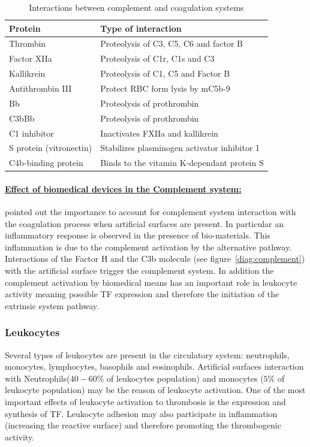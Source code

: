 \documentclass[%
 nofootinbib,
 amsmath,amssymb,
 aps,
 pra,
]{revtex4-1}
\begin{document}
\begin{table}[h]
\begin{tabular}{l l}
\hline
Protein & Type of interaction \\
\hline
Thrombin & Proteolysis of C3, C5, C6 and factor B\\
Factor XIIa & Proteolysis of C1r, C1s and C3\\
Kallikrein & Proteolysis of C1, C5 and Factor B \\
Antithrombin III & Protect RBC form lysis by mC5b-9\\
Bb & Proteolysis of prothrombin \\
C3bBb & Proteolysis of prothrombin \\
C1 inhibitor & Inactivates FXIIa and kallikrein \\
S protein (vitronectin) & Stabilizes plasminogen activator inhibitor 1 \\
C4b-binding protein & Binds to the vitamin K-dependant protein S \\
\hline
\end{tabular}
\caption{\label{tab:comple}Interactions between complement and coagulation systems \cite{Gorbet:2004}}
\end{table}
\paragraph{\underline{Effect of biomedical devices in the Complement system:}}
\citet{Gorbet:2004} pointed out the importance to account for complement system interaction with the coagulation process when artificial surfaces are present. In particular an inflammatory response is observed in the presence of bio-materials. This inflammation is due to the complement activation by the alternative pathway. Interactions of the Factor H and the C3b molecule (see figure~\ref{diag:complement}) with the artificial surface trigger the complement system. In addition the complement activation by biomedical means has an important role in leukocyte activity meaning possible TF expression and therefore the initiation of the extrinsic system pathway.
\subsubsection{Leukocytes}
Several types of leukocytes are present in the circulatory system: neutrophils, monocytes, lymphocytes, basophils and eosinophils. Artificial surfaces interaction with Neutrophils($40-60 \%$ of leukocytes population) and monocytes ($5 \%$ of leukocyte population)  may be the reason of leukocyte activation. One of the most important effects of leukocyte activation to thrombosis is the expression and synthesis of TF. Leukocyte adhesion may also participate in inflammation (increasing the reactive surface) and therefore promoting the thrombogenic activity.\\
\end{document}
